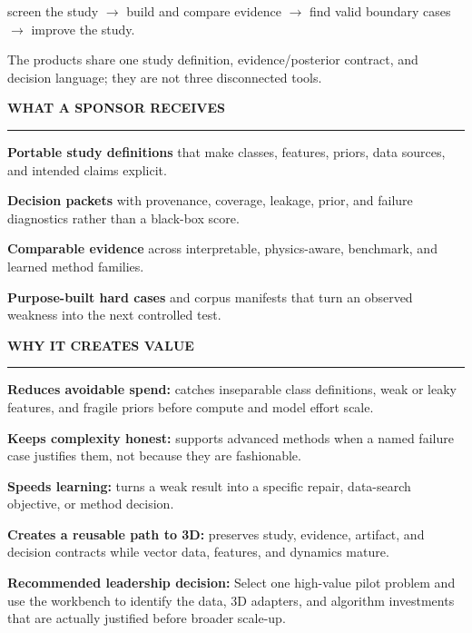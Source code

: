 \documentclass[9pt]{article}
\newcommand{\sectionlabel}[1]{%
  \vspace{0.45em}%
  {\color{teal}\footnotesize\bfseries\MakeUppercase{#1}}\par
  \vspace{0.18em}%
  {\color{line}\rule{\textwidth}{0.55pt}}\par
  \vspace{0.34em}%
}
\newcommand{\valuebullet}[1]{%
  \noindent\makebox[0.95em][l]{\color{teal}\textbullet}%
  \parbox[t]{\dimexpr\linewidth-0.95em\relax}{#1}\par\vspace{0.28em}%
}
\begin{document}
\vspace{0.36em}
\small
screen the study \(\rightarrow\) build and compare evidence \(\rightarrow\) find valid boundary cases \(\rightarrow\) improve the study.\par
The products share one study definition, evidence/posterior contract, and decision language; they are not three disconnected tools.

\begin{minipage}[t]{0.485\textwidth}
  \sectionlabel{What a sponsor receives}
  \small
  \valuebullet{\textbf{Portable study definitions} that make classes, features, priors, data sources, and intended claims explicit.}
  \valuebullet{\textbf{Decision packets} with provenance, coverage, leakage, prior, and failure diagnostics rather than a black-box score.}
  \valuebullet{\textbf{Comparable evidence} across interpretable, physics-aware, benchmark, and learned method families.}
  \valuebullet{\textbf{Purpose-built hard cases} and corpus manifests that turn an observed weakness into the next controlled test.}
\end{minipage}%
\hfill
\begin{minipage}[t]{0.485\textwidth}
  \sectionlabel{Why it creates value}
  \small
  \valuebullet{\textbf{Reduces avoidable spend:} catches inseparable class definitions, weak or leaky features, and fragile priors before compute and model effort scale.}
  \valuebullet{\textbf{Keeps complexity honest:} supports advanced methods when a named failure case justifies them, not because they are fashionable.}
  \valuebullet{\textbf{Speeds learning:} turns a weak result into a specific repair, data-search objective, or method decision.}
  \valuebullet{\textbf{Creates a reusable path to 3D:} preserves study, evidence, artifact, and decision contracts while vector data, features, and dynamics mature.}
\end{minipage}

\vspace{0.32em}
\setlength{\fboxsep}{7pt}
\noindent{}\par

\vspace{0.33em}
\setlength{\fboxsep}{8pt}
\noindent\colorbox{ink}{%
  \parbox{\dimexpr\textwidth-2\fboxsep\relax}{%
    \color{white}\small\textbf{Recommended leadership decision:} Select one high-value pilot problem and use the workbench to identify the data, 3D adapters, and algorithm investments that are actually justified before broader scale-up.
  }%
}
\end{document}

